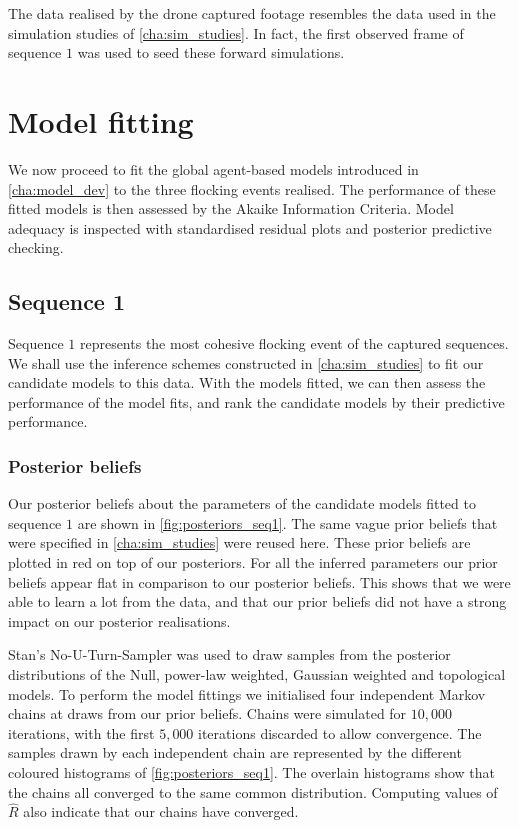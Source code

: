 The data realised by the drone captured footage resembles the data used in the
simulation studies of \cref{cha:sim_studies}. In fact, the first observed frame
of sequence $1$ was used to seed these forward simulations.
    
\section{Model fitting}

We now proceed to fit the global agent-based models introduced in
\cref{cha:model_dev} to the three flocking events realised. The performance of
these fitted models is then assessed by the Akaike Information Criteria. Model
adequacy is inspected with standardised residual plots and posterior predictive
checking.

\subsection{Sequence 1}

Sequence $1$ represents the most cohesive flocking event of the captured
sequences. We shall use the inference schemes constructed in
\cref{cha:sim_studies} to fit our candidate models to this data. With the
models fitted, we can then assess the performance of the model fits, and rank
the candidate models by their predictive performance.

\subsubsection{Posterior beliefs}

Our posterior beliefs about the parameters of the candidate models fitted to
sequence $1$ are shown in \cref{fig:posteriors_seq1}. The same vague prior
beliefs that were specified in \cref{cha:sim_studies} were reused here. These
prior beliefs are plotted in red on top of our posteriors. For all the inferred
parameters our prior beliefs appear flat in comparison to our posterior
beliefs. This shows that we were able to learn a lot from the data, and that
our prior beliefs did not have a strong impact on our posterior realisations.

Stan's No-U-Turn-Sampler was used to draw samples from the posterior
distributions of the Null, power-law weighted, Gaussian weighted and
topological models. To perform the model fittings we initialised four
independent Markov chains at draws from our prior beliefs. Chains were
simulated for $10,000$ iterations, with the first $5,000$ iterations discarded
to allow convergence. The samples drawn by each independent chain are
represented by the different coloured histograms of \cref{fig:posteriors_seq1}.
The overlain histograms show that the chains all converged to the same common
distribution. Computing values of $\widehat{R}$ also indicate that our chains
have converged.

